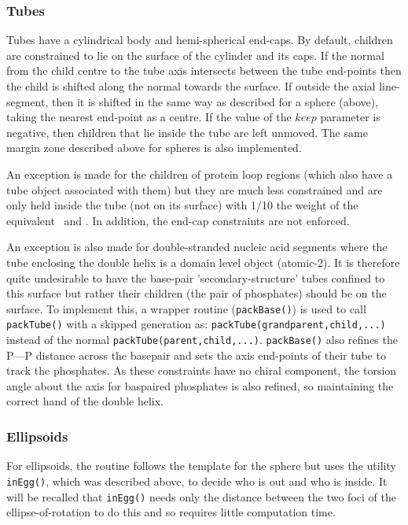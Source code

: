 \subsubsection{Tubes}

Tubes have a cylindrical body and hemi-spherical end-caps.  By default, children are constrained to 
lie on the surface of the cylinder and its caps.   If the normal from the child centre to the tube axis
intersects between the tube end-points then the child is shifted along the normal towards the surface.  
If outside the axial line-segment,
then it is shifted in the same way as described for a sphere (above), taking the nearest end-point as a
centre.  If the value of the $keep$ parameter is negative, then children that lie inside the tube are left
unmoved.  The same margin zone described above for spheres is also implemented.

An exception is made for the children of protein loop regions (which also have a
tube object associated with them) but they are much less constrained and are only held
inside the tube (not on its surface) with 1/10 the weight of the equivalent \AH\ and \Bs.  
In addition, the end-cap constraints are not enforced.

An exception is also made for double-stranded nucleic acid segments where the tube enclosing the
double helix is a domain level object (atomic-2).   It is therefore quite undesirable to have the
base-pair 'secondary-structure' tubes confined to this surface but rather their children (the pair
of phosphates) should be on the surface.  To implement this, a wrapper routine ({\tt packBase()})
is used to call {\tt packTube()} with a skipped generation as: {\tt packTube(grandparent,child,...)}
instead of the normal {\tt packTube(parent,child,...)}.  {\tt packBase()} also refines the P---P
distance across the basepair and sets the axis end-points of their tube to track the phosphates.
As these constraints have no chiral component, the torsion angle about the axis for baspaired
phosphates is also refined, so maintaining the correct hand of the double helix.

\subsubsection{Ellipsoids}

For ellipsoids, the  routine follows the template for the sphere but uses the utility {\tt inEgg()},
which was described above, to decide who is out and who is inside.   It will be recalled that
{\tt inEgg()} needs only the distance between the two foci of the ellipse-of-rotation to do this
and so requires little computation time.

